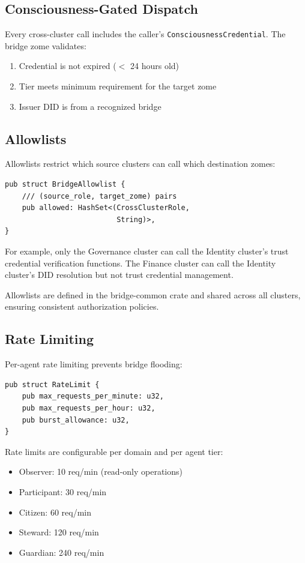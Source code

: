 \documentclass[11pt,twocolumn]{article}
\begin{document}
\subsection{Consciousness-Gated Dispatch}

Every cross-cluster call includes the caller's \texttt{ConsciousnessCredential}.
The bridge zome validates:

\begin{enumerate}[nosep]
  \item Credential is not expired ($<$ 24 hours old)
  \item Tier meets minimum requirement for the target zome
  \item Issuer DID is from a recognized bridge
\end{enumerate}

\subsection{Allowlists}

Allowlists restrict which source clusters can call which destination zomes:

\begin{lstlisting}
pub struct BridgeAllowlist {
    /// (source_role, target_zome) pairs
    pub allowed: HashSet<(CrossClusterRole,
                          String)>,
}
\end{lstlisting}

For example, only the Governance cluster can call the Identity cluster's
trust credential verification functions. The Finance cluster can call the
Identity cluster's DID resolution but not trust credential management.

Allowlists are defined in the bridge-common crate and shared across all
clusters, ensuring consistent authorization policies.

\subsection{Rate Limiting}

Per-agent rate limiting prevents bridge flooding:

\begin{lstlisting}
pub struct RateLimit {
    pub max_requests_per_minute: u32,
    pub max_requests_per_hour: u32,
    pub burst_allowance: u32,
}
\end{lstlisting}

Rate limits are configurable per domain and per agent tier:
\begin{itemize}[nosep]
  \item Observer: 10 req/min (read-only operations)
  \item Participant: 30 req/min
  \item Citizen: 60 req/min
  \item Steward: 120 req/min
  \item Guardian: 240 req/min
\end{itemize}
\end{document}
